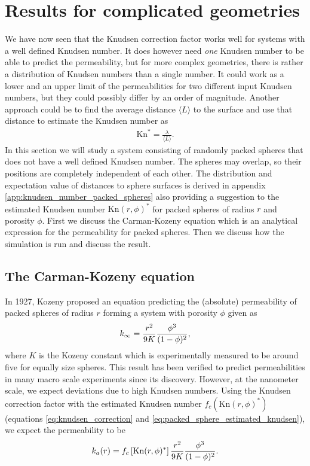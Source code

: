 \section{Results for complicated geometries}
\label{sec:dsmc_packed_spheres_results}
We have now seen that the Knudsen correction factor works well for systems with a well defined Knudsen number. It does however need \textit{one} Knudsen number to be able to predict the permeability, but for more complex geometries, there is rather a distribution of Knudsen numbers than a single number. It could work as a lower and an upper limit of the permeabilities for two different input Knudsen numbers, but they could possibly differ by an order of magnitude. Another approach could be to find the average distance $\langle L\rangle$ to the surface and use that distance to estimate the Knudsen number as
\begin{align}
    \text{Kn}^* = \frac{\lambda}{\langle L \rangle}.
\end{align}
In this section we will study a system consisting of randomly packed spheres  that does not have a well defined Knudsen number. The spheres may overlap, so their positions are completely independent of each other. The distribution and expectation value of distances to sphere surfaces is derived in appendix \ref{app:knudsen_number_packed_spheres} also providing a suggestion to the estimated Knudsen number $\text{Kn}(r,\phi)^*$ for packed spheres of radius $r$ and porosity $\phi$. First we discuss the Carman-Kozeny equation which is an analytical expression for the permeability for packed spheres. Then we discuss how the simulation is run and discuss the result.
\subsection{The Carman-Kozeny equation}
In 1927, Kozeny proposed an equation predicting the (absolute) permeability of packed spheres of radius $r$ forming a system with porosity $\phi$ given as
\begin{align}
	k_\infty = {r^2 \over 9K} {\phi^3 \over (1 - \phi)^2},
\end{align}
where $K$ is the Kozeny constant which is experimentally measured to be around five for equally size spheres\cite{carman1937fluid}. This result has been verified to predict permeabilities in many macro scale experiments since its discovery. However, at the nanometer scale, we expect deviations due to high Knudsen numbers. Using the Knudsen correction factor with the estimated Knudsen number $f_c(\text{Kn}(r,\phi)^*)$ (equations \eqref{eq:knudsen_correction} and \eqref{eq:packed_sphere_estimated_knudsen}), we expect the permeability to be
\begin{align}
    k_a(r) = f_c\left[\text{Kn}(r,\phi)^*\right]{r^2 \over 9K} {\phi^3 \over (1 - \phi)^2}.
\end{align}
